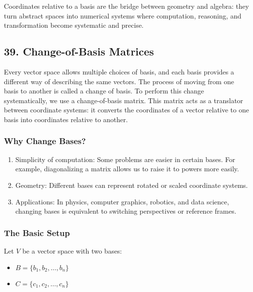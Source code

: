 \documentclass[
  letterpaper,
  DIV=11,
  numbers=noendperiod]{scrreprt}
\providecommand{\tightlist}{%
  \setlength{\itemsep}{0pt}\setlength{\parskip}{0pt}}
\begin{document}
Coordinates relative to a basis are the bridge between geometry and
algebra: they turn abstract spaces into numerical systems where
computation, reasoning, and transformation become systematic and
precise.

\subsection{39. Change-of-Basis
Matrices}\label{change-of-basis-matrices}

Every vector space allows multiple choices of basis, and each basis
provides a different way of describing the same vectors. The process of
moving from one basis to another is called a change of basis. To perform
this change systematically, we use a change-of-basis matrix. This matrix
acts as a translator between coordinate systems: it converts the
coordinates of a vector relative to one basis into coordinates relative
to another.

\subsubsection{Why Change Bases?}\label{why-change-bases}

\begin{enumerate}
\def\labelenumi{\arabic{enumi}.}
\tightlist
\item
  Simplicity of computation: Some problems are easier in certain bases.
  For example, diagonalizing a matrix allows us to raise it to powers
  more easily.
\item
  Geometry: Different bases can represent rotated or scaled coordinate
  systems.
\item
  Applications: In physics, computer graphics, robotics, and data
  science, changing bases is equivalent to switching perspectives or
  reference frames.
\end{enumerate}

\subsubsection{The Basic Setup}\label{the-basic-setup}

Let \(V\) be a vector space with two bases:

\begin{itemize}
\tightlist
\item
  \(B = \{b_1, b_2, \dots, b_n\}\)
\item
  \(C = \{c_1, c_2, \dots, c_n\}\)
\end{itemize}
\end{document}
